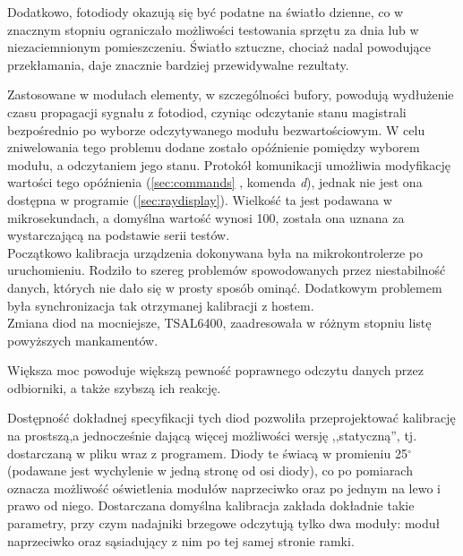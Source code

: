 Dodatkowo, fotodiody okazują się być podatne na światło dzienne, co w znacznym stopniu ograniczało możliwości testowania sprzętu za dnia lub w niezaciemnionym pomieszczeniu. Światło sztuczne, chociaż nadal powodujące przekłamania, daje znacznie bardziej przewidywalne rezultaty.

Zastosowane w modułach elementy, w szczególności bufory, powodują wydłużenie czasu propagacji sygnału z fotodiod, czyniąc odczytanie stanu magistrali bezpośrednio po wyborze odczytywanego modułu bezwartościowym.
W celu zniwelowania tego problemu dodane zostało opóźnienie pomiędzy wyborem modułu, a odczytaniem jego stanu.
Protokół komunikacji umożliwia modyfikację wartości tego opóźnienia (\ref{sec:commands} , komenda \textsl{d}), jednak nie jest ona dostępna w programie  (\ref{sec:raydisplay}).
Wielkość ta jest podawana w mikrosekundach, a domyślna wartość wynosi 100, została ona uznana za wystarczającą na podstawie serii testów.\\



Początkowo kalibracja urządzenia dokonywana była na mikrokontrolerze po uruchomieniu.
Rodziło to szereg problemów spowodowanych przez niestabilność danych, których nie dało się w prosty sposób ominąć.
Dodatkowym problemem była synchronizacja tak otrzymanej kalibracji z hostem.\\


Zmiana diod na mocniejsze, TSAL6400, zaadresowała w różnym stopniu listę powyższych mankamentów.

Większa moc powoduje większą pewność poprawnego odczytu danych przez odbiorniki, a także szybszą ich reakcję.

Dostępność dokładnej specyfikacji tych diod pozwoliła przeprojektować kalibrację na prostszą,a jednocześnie dającą więcej możliwości wersję ,,statyczną'', tj. dostarczaną w pliku wraz z programem.
Diody te świacą w promieniu 25$^{\circ}$ (podawane jest wychylenie w jedną stronę od osi diody), co po pomiarach oznacza możliwość oświetlenia modułów naprzeciwko oraz po jednym na lewo i prawo od niego.
Dostarczana domyślna kalibracja zakłada dokładnie takie parametry, przy czym nadajniki brzegowe odczytują tylko dwa moduły: moduł naprzeciwko oraz sąsiadujący z nim po tej samej stronie ramki.

